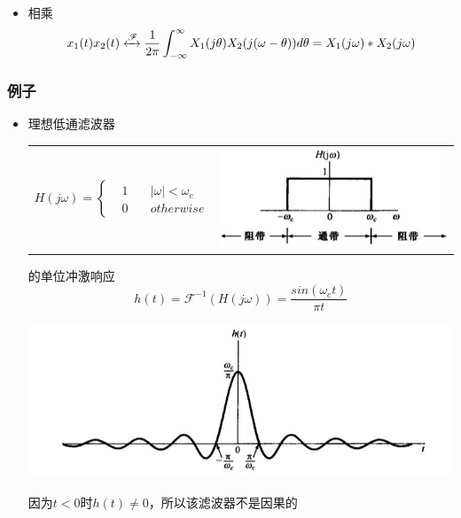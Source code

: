 \documentclass[CJKutf8,dvipsnames,table]{beamer}
\begin{document}
\begin{CJK*}{UTF8}{song}
\begin{frame}
\begin{itemize}
    \item 相乘
    \[
    	x_1(t)x_2(t) \xleftrightarrow{\mathscr{F}} \frac{1}{2\pi} \int_{-\infty}^{\infty}X_1(j\theta)X_2(j(\omega-\theta))d\theta = X_1(j\omega) \ast X_2(j\omega)
    \]    	
    \end{itemize}
  \end{frame}   
  	
  \begin{frame}
    \frametitle{例子}
    \begin{itemize}
    \item 理想低通滤波器 \\
	\begin{tabular}{ll}
	\raisebox{-.5\height}

    \begin{math}
H(j\omega) = 
\left\{
    \begin {aligned}
         & 1 \quad & |\omega| < \omega_c \\
         & 0 \quad & otherwise                  
    \end{aligned}
\right.
	\end{math}

&
    \includegraphics[valign=m,scale=.35]{ss-c-f4-20}    \\
    \end{tabular}      
    
    的单位冲激响应
    \[
    h(t)=\mathscr{F}^{-1}(H(j\omega))=\frac{sin(\omega_c t)}{\pi t}
    \]
    \begin{center}
      \includegraphics[scale=.4]{ss-c-f4-21}
    \end{center}
    因为$t<0$时$h(t)\neq 0$，所以该滤波器不是因果的
    

\end{itemize}
\end{frame}
\end{CJK*}
\end{document}

